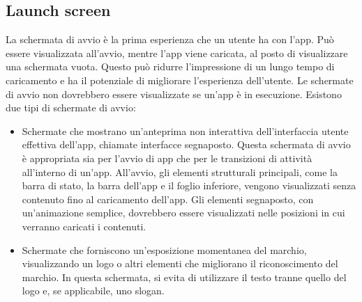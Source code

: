 \documentclass[12pt, a4paper]{report}
\begin{document}
	\subsection{Launch screen}
	La schermata di avvio è la prima esperienza che un utente ha con l’app. Può essere visualizzata all'avvio, mentre l’app viene caricata, al posto di visualizzare una schermata vuota. Questo può ridurre
	l’impressione di un lungo tempo di caricamento e ha il potenziale di migliorare l'esperienza dell'utente. Le schermate di avvio non dovrebbero essere visualizzate se un'app è in esecuzione. Esistono due tipi di schermate di avvio:
	\begin{itemize}
		\item Schermate che mostrano un'anteprima non interattiva dell'interfaccia utente effettiva dell'app, chiamate interfacce segnaposto. Questa schermata di avvio è appropriata sia per l'avvio di app che per
		le transizioni di attività all'interno di un'app. All'avvio, gli elementi strutturali principali, come la barra di stato, la barra dell'app e il foglio inferiore, vengono visualizzati senza contenuto fino
		al caricamento dell'app. Gli elementi segnaposto, con un'animazione semplice, dovrebbero essere visualizzati nelle posizioni in cui verranno caricati i contenuti.
		\item Schermate che forniscono un'esposizione momentanea del marchio, visualizzando un logo o altri elementi che migliorano il riconoscimento del marchio. In questa schermata, si evita di utilizzare il testo tranne quello del  logo e, se applicabile, uno slogan.
	\end{itemize}
\end{document}

